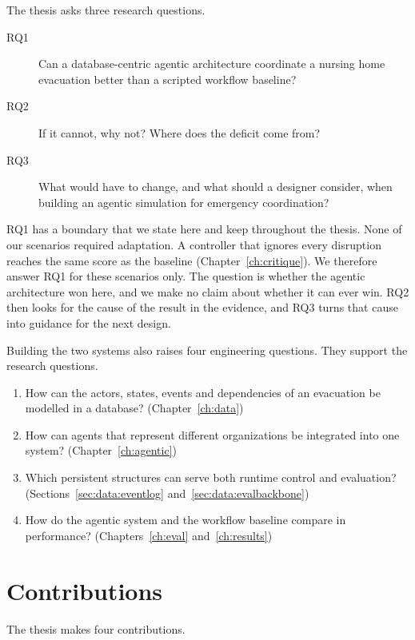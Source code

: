 The thesis asks three research questions.

\begin{description}
\item[RQ1] Can a database-centric agentic architecture coordinate a nursing
  home evacuation better than a scripted workflow baseline?
\item[RQ2] If it cannot, why not? Where does the deficit come from?
\item[RQ3] What would have to change, and what should a designer consider,
  when building an agentic simulation for emergency coordination?
\end{description}

RQ1 has a boundary that we state here and keep throughout the thesis. None of
our scenarios required adaptation. A controller that ignores every disruption
reaches the same score as the baseline (Chapter~\ref{ch:critique}). We
therefore answer RQ1 for these scenarios only. The question is whether the
agentic architecture won here, and we make no claim about whether it can ever
win. RQ2 then looks for the cause of the result in the evidence, and RQ3 turns
that cause into guidance for the next design.

Building the two systems also raises four engineering questions. They support
the research questions.

\begin{enumerate}
\item How can the actors, states, events and dependencies of an evacuation be
  modelled in a database? (Chapter~\ref{ch:data})
\item How can agents that represent different organizations be integrated into
  one system? (Chapter~\ref{ch:agentic})
\item Which persistent structures can serve both runtime control and
  evaluation? (Sections~\ref{sec:data:eventlog}
  and~\ref{sec:data:evalbackbone})
\item How do the agentic system and the workflow baseline compare in
  performance? (Chapters~\ref{ch:eval} and~\ref{ch:results})
\end{enumerate}

\section{Contributions}
\label{sec:intro:contributions}

The thesis makes four contributions.

